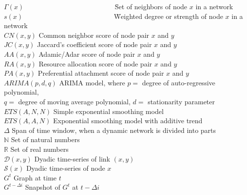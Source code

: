 \listofsymbols
\begin{tabbing}
  $\Gamma(x)$ ~~~~~~~~~~~~~~~~~~~~~~~~~~\= Set of neighbors of node $x$ in a network\\
  $s(x)$ ~~~~~~~~~~~~~~~~~~~~~~~~~~\= Weighted degree or strength of node $x$ in a network\\
  $CN(x,y)$ \> Common neighbor score of node pair $x$ and $y$ \\
  $JC(x,y)$ \> Jaccard's coefficient score of node pair $x$ and $y$ \\
  $AA(x,y)$ \> Adamic/Adar score of node pair $x$ and $y$ \\
  $RA(x,y)$ \> Resource allocation score of node pair $x$ and $y$ \\
  $PA(x,y)$ \> Preferential attachment score of node pair $x$ and $y$ \\
  $ARIMA(p,d,q)$ \> ARIMA model, where $p=$ degree of auto-regressive polynomial,\\ \> $q=$ degree of moving average polynomial, $d=$ stationarity parameter \\
  $ETS(A,N,N)$ \> Simple exponential smoothing model\\
  $ETS(A,A,N)$ \> Exponential smoothing model with additive trend\\
  $\Delta$ \> Span of time window, when a dynamic network is divided into parts \\
  $\mathbb{N}$ \> Set of natural numbers \\
  $\mathbb{R}$ \> Set of real numbers \\
  $\mathscr D(x,y)$ \> Dyadic time-series of link $(x,y)$\\
  $\mathscr S(x)$ \> Dyadic time-series of node $x$\\
  $G^t$ \> Graph at time $t$\\
  $G^{t-\Delta i}$ \> Snapshot of $G^t$ at ${t-\Delta i}$\\
\end{tabbing}
\endlistofsymbols